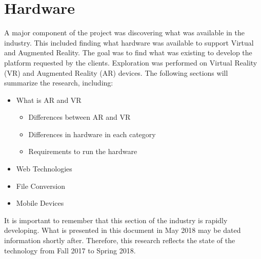 
\section{Hardware}

	A major component of the project was discovering what was available in the industry.  This included finding what hardware was available to support Virtual and Augmented Reality.  The goal was to find what was existing to develop the platform requested by the clients.  Exploration was performed on Virtual Reality (VR) and Augmented Reality (AR) devices.  The following sections will summarize the research, including:

	\begin{itemize}
		\item What is AR and VR
		\begin{itemize}
			\item Differences between AR and VR
			\item Differences in hardware in each category
			\item Requirements to run the hardware
		\end{itemize}

		\item Web Technologies
		\item File Conversion
		\item Mobile Devices
	\end{itemize}
	
	It is important to remember that this section of the industry is rapidly developing.  What is presented in this document in May 2018 may be dated information shortly after.  Therefore, this research reflects the state of the technology from Fall 2017 to Spring 2018.

	
	
	